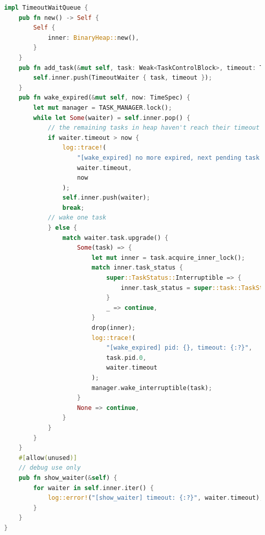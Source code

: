 \begin{lstlisting}[language=rust,caption={TimeoutWaitQueue下的方法}]
    impl TimeoutWaitQueue {
    pub fn new() -> Self {
        Self {
            inner: BinaryHeap::new(),
        }
    }
    pub fn add_task(&mut self, task: Weak<TaskControlBlock>, timeout: TimeSpec) {
        self.inner.push(TimeoutWaiter { task, timeout });
    }
    pub fn wake_expired(&mut self, now: TimeSpec) {
        let mut manager = TASK_MANAGER.lock();
        while let Some(waiter) = self.inner.pop() {
            // the remaining tasks in heap haven't reach their timeout
            if waiter.timeout > now {
                log::trace!(
                    "[wake_expired] no more expired, next pending task timeout: {:?}, now: {:?}",
                    waiter.timeout,
                    now
                );
                self.inner.push(waiter);
                break;
            // wake one task
            } else {
                match waiter.task.upgrade() {
                    Some(task) => {
                        let mut inner = task.acquire_inner_lock();
                        match inner.task_status {
                            super::TaskStatus::Interruptible => {
                                inner.task_status = super::task::TaskStatus::Ready
                            }
                            _ => continue,
                        }
                        drop(inner);
                        log::trace!(
                            "[wake_expired] pid: {}, timeout: {:?}",
                            task.pid.0,
                            waiter.timeout
                        );
                        manager.wake_interruptible(task);
                    }
                    None => continue,
                }
            }
        }
    }
    #[allow(unused)]
    // debug use only
    pub fn show_waiter(&self) {
        for waiter in self.inner.iter() {
            log::error!("[show_waiter] timeout: {:?}", waiter.timeout);
        }
    }
}
\end{lstlisting}
